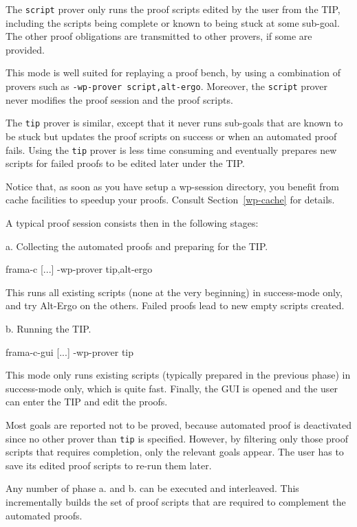 The \verb+script+ prover only runs the proof scripts edited by the user from the TIP, including the scripts being complete or known to being stuck at some sub-goal. The other proof obligations are transmitted to other provers, if some are provided.

This mode is well suited for replaying a proof bench, by using a combination of provers such as \verb+-wp-prover script,alt-ergo+. Moreover, the \verb+script+ prover never modifies the proof session and the proof scripts.

The \verb+tip+ prover is similar, except that it never runs sub-goals that are known to be stuck but updates the proof scripts on success or when an automated proof fails. Using the \verb+tip+ prover is less time consuming and eventually prepares new scripts for failed proofs to be edited later under the TIP.

Notice that, as soon as you have setup a wp-session directory, you benefit from cache facilities to speedup your proofs. Consult Section~\ref{wp-cache} for details.

\clearpage
A typical proof session consists then in the following stages:

a. Collecting the automated proofs and preparing for the TIP.
\begin{logs}
  frama-c [...] -wp-prover tip,alt-ergo
\end{logs}

This runs all existing scripts (none at the very beginning) in success-mode only, and try Alt-Ergo on the others. Failed proofs lead to new empty scripts created.

b. Running the TIP.
\begin{logs}
  frama-c-gui [...] -wp-prover tip
\end{logs}

This mode only runs existing scripts (typically prepared in the previous phase) in success-mode only, which is quite fast. Finally, the GUI is opened and the user can enter the TIP and edit the proofs.

Most goals are reported not to be proved, because automated proof is deactivated since no other prover than \verb+tip+ is specified. However, by filtering only those proof scripts that requires completion, only the relevant goals appear. The user has to save its edited proof scripts to re-run them later.

Any number of phase a. and b. can be executed and interleaved. This incrementally builds the set of proof scripts that are required to complement the automated proofs.

